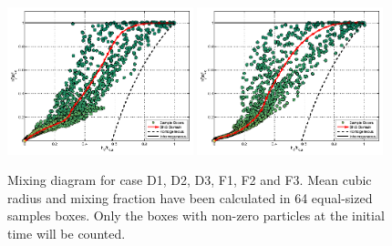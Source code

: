 \documentclass[draft,jgrga]{AGUTeX}
\begin{document}
\begin{article}
\begin{figure}
\includegraphics[width=0.48\textwidth]{Figures/mixing_cased3}
\includegraphics[width=0.48\textwidth]{Figures/mixing_casef3}
\caption{Mixing diagram for case D1, D2, D3, F1, F2 and F3. Mean cubic radius and mixing fraction have been calculated in 64 equal-sized samples boxes. Only the boxes with non-zero particles at the initial time will be counted.\label{mixing_diagram}}
\end{figure}


\end{article}
\end{document}

